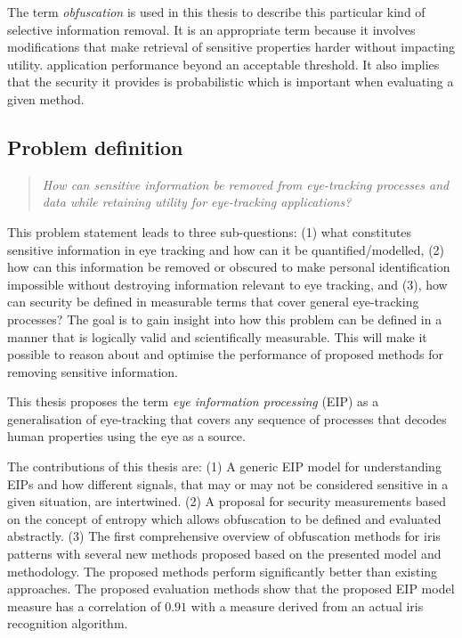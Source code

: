 The term \emph{obfuscation} is used in this thesis to describe this particular kind of selective information removal. It is an appropriate term because it involves modifications that make retrieval of sensitive properties harder without impacting utility.  application performance beyond an acceptable threshold. It also implies that the security it provides is probabilistic which is important when evaluating a given method.

\subsection{Problem definition}
\begin{quotation}
\emph{How can sensitive information be removed from eye-tracking processes and data while retaining utility for eye-tracking applications?}
\end{quotation}

This problem statement leads to three sub-questions: (1) what constitutes sensitive information in eye tracking and how can it be quantified/modelled, (2) how can this information be removed or obscured to make personal identification impossible without destroying information relevant to eye tracking, and (3), how can security be defined in measurable terms that cover general eye-tracking processes? The goal is to gain insight into how this problem can be defined in a manner that is logically valid and scientifically measurable. This will make it possible to reason about and optimise the performance of proposed methods for removing sensitive information. 


This thesis proposes the term \emph{eye information processing} (EIP) as a generalisation of eye-tracking that covers any sequence of processes that decodes human properties using the eye as a source. 


The contributions of this thesis are: (1) A generic EIP model for understanding EIPs and how different signals, that may or may not be considered sensitive in a given situation, are intertwined. (2) A proposal for security measurements based on the concept of entropy which allows obfuscation to be defined and evaluated abstractly. (3) The first comprehensive overview of obfuscation methods for iris patterns with several new methods proposed based on the presented model and methodology. The proposed methods perform significantly better than existing approaches. The proposed evaluation methods show that the proposed EIP model measure has a correlation of $0.91$ with a measure derived from an actual iris recognition algorithm.

